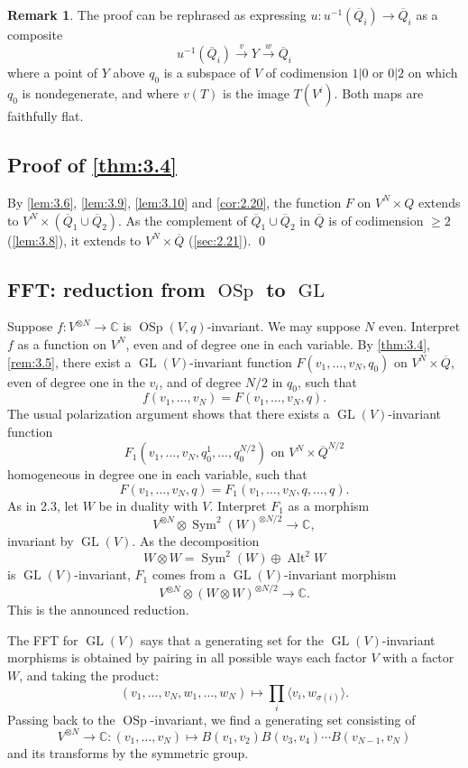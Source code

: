 \documentclass[11pt,a4paper]{article}
\theoremstyle{plain}
\theoremstyle{definition}
\newtheorem{remark}[theorem]{Remark}
\DeclareMathOperator{\GL}{GL}
\DeclareMathOperator{\OSp}{OSp}
\DeclareMathOperator{\Alt}{Alt}
\DeclareMathOperator{\Sym}{Sym}
\newcommand{\C}{\mathbb{C}}
\begin{document}
\begin{remark}\label{rem:3.11}
The proof can be rephrased as expressing $u: u^{-1}(\overline{Q}_i) \to \overline{Q}_i$ as a composite
\[
u^{-1}(\overline{Q}_i) \xrightarrow{v} Y \xrightarrow{w} \overline{Q}_i
\]
where a point of $Y$ above $q_0$ is a subspace of $V$ of codimension $1|0$ or $0|2$ on which $q_0$ is nondegenerate, and where $v(T)$ is the image $T(V^i)$. Both maps are faithfully flat.
\end{remark}

\subsection{Proof of \ref{thm:3.4}}
\label{sec:3.12}
By \ref{lem:3.6}, \ref{lem:3.9}, \ref{lem:3.10} and \ref{cor:2.20}, the function $F$ on $V^N \times Q$ extends to $V^N \times (\overline{Q}_1 \cup \overline{Q}_2)$. As the complement of $\overline{Q}_1 \cup \overline{Q}_2$ in $\overline{Q}$ is of codimension $\geq 2$ (\ref{lem:3.8}), it extends to $V^N \times \overline{Q}$ (\ref{sec:2.21}).
\qed

\subsection{FFT: reduction from $\OSp$ to $\GL$}
\label{sec:3.13}
Suppose $f : V^{\otimes N} \to \C$ is $\OSp(V,q)$-invariant. We may suppose $N$ even. Interpret $f$ as a function on $V^N$, even and of degree one in each variable. By \ref{thm:3.4}, \ref{rem:3.5}, there exist a $\GL(V)$-invariant function $F(v_1,\dots,v_N, q_0)$ on $V^N \times \overline{Q}$, even of degree one in the $v_i$, and of degree $N/2$ in $q_0$, such that
\[
f(v_1,\dots,v_N) = F(v_1,\dots,v_N, q).
\]
The usual polarization argument shows that there exists a $\GL(V)$-invariant function
\[
F_1(v_1,\dots,v_N, q_0^1,\dots,q_0^{N/2}) \text{ on } V^N \times \overline{Q}^{N/2}
\]
homogeneous in degree one in each variable, such that
\[
F(v_1,\dots,v_N, q) = F_1(v_1,\dots,v_N, q, \dots, q).
\]
As in 2.3, let $W$ be in duality with $V$. Interpret $F_1$ as a morphism
\[
V^{\otimes N} \otimes \Sym^2(W)^{\otimes N/2} \to \C,
\]
invariant by $\GL(V)$. As the decomposition
\[
W \otimes W = \Sym^2(W) \oplus \Alt^2 W
\]
is $\GL(V)$-invariant, $F_1$ comes from a $\GL(V)$-invariant morphism
\[
V^{\otimes N} \otimes (W \otimes W)^{\otimes N/2} \to \C.
\]
This is the announced reduction.

The FFT for $\GL(V)$ says that a generating set for the $\GL(V)$-invariant morphisms is obtained by pairing in all possible ways each factor $V$ with a factor $W$, and taking the product:
\[
(v_1,\dots,v_N, w_1,\dots,w_N) \mapsto \prod_i \langle v_i, w_{\sigma(i)} \rangle.
\]
Passing back to the $\OSp$-invariant, we find a generating set consisting of
\[
V^{\otimes N} \to \C : (v_1,\dots,v_N) \mapsto B(v_1,v_2) B(v_3,v_4) \cdots B(v_{N-1}, v_N)
\]
and its transforms by the symmetric group.
\end{document}
